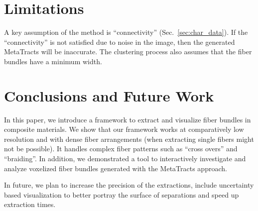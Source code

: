 \section{Limitations}
A key assumption of the method is ``connectivity'' (Sec.~\ref{sec:char_data}).
If the ``connectivity'' is not satisfied due to noise in the image, then the  generated MetaTracts will be inaccurate. 
The clustering process also assumes that the fiber bundles have a minimum width.
\section{Conclusions and Future Work}\label{subsec:conclusions}
In this paper, we introduce a framework to extract and visualize fiber bundles in composite materials. We show that our framework works at comparatively low resolution and with dense fiber arrangements (when extracting single fibers might not be possible). It handles complex fiber patterns such as ``cross overs'' and ``braiding''.
In addition, we demonstrated a tool to interactively investigate and analyze voxelized fiber bundles generated with the MetaTracts approach.

In future, we plan to increase the precision of the extractions, include uncertainty based visualization to better portray the surface of separations and speed up extraction times.
